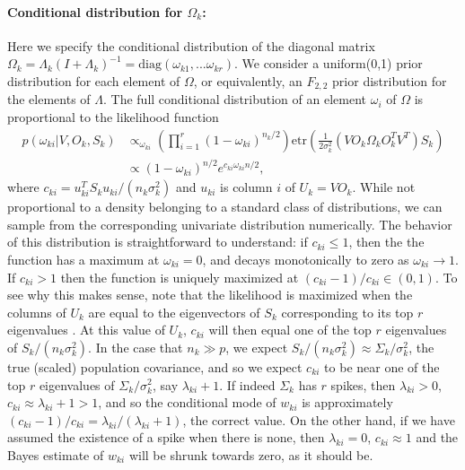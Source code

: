 \documentclass{statsoc}
\newcommand{\etr}{\text{etr}}
\begin{document}
\paragraph{Conditional distribution for $\Omega_k$:} Here we specify the
conditional distribution of the diagonal matrix
$\Omega_k = \Lambda_k(I+\Lambda_k)^{-1} = \text{diag}(\omega_{k1},
... \omega_{kr})$.
We consider a uniform(0,1) prior distribution for each element of
$\Omega$, or equivalently, an $F_{2,2}$ prior distribution for the
elements of $\Lambda$.  The full conditional distribution of an
element $\omega_i$ of $\Omega$ is proportional to the likelihood
function
\begin{align}
p(\omega_{ki}|V, O_k, S_k) &\propto_{\omega_{ki}}
  \left(\prod_{i=1}^r(1-\omega_{ki})^{n_k/2}  \right)
  \etr(\frac{1}{2\sigma_k^2}(VO_k\Omega_kO_k^TV^T)S_k) \\
&  \propto  (1-\omega_{ki})^{n/2} e^{c_{ki} \omega_{ki}  n/2},    
\label{eqn:wpost}
\end{align}
%
\noindent where $c_{ki} = u_{ki}^T S_k u_{ki}/(n_k \sigma^2_k)$ and $ u_{ki}$ is
column $i$ of $U_k = VO_k$.  While not proportional to a density
belonging to a standard class of distributions, we can sample from the
corresponding univariate distribution numerically.  The behavior of
this distribution is straightforward to understand: if $c_{ki}\leq 1$, then
the the function has a maximum at $\omega_{ki} =0$, and decays
monotonically to zero as $\omega_{ki} \rightarrow 1$.  If $c_{ki}>1$ then the
function is uniquely maximized at $(c_{ki}-1)/c_{ki} \in (0,1)$.  To see why
this makes sense, note that the likelihood is maximized when the
columns of $ U_k$ are equal to the eigenvectors of $S_k$
corresponding to its top $r$ eigenvalues
\citep{Tipping1999}. At this value of $U_k$, $c_{ki}$ will then
equal one of the top $r$ eigenvalues of $ S_k/(n_k\sigma_k^2)$.  In the
case that $n_k\gg p$, we expect
$ S_k/(n_k\sigma_k^2)\approx \Sigma_k/\sigma_k^2$, the true (scaled)
population covariance, and so we expect $c_{ki}$ to be near one of the top
$r$ eigenvalues of $\Sigma_k/\sigma^2_k$, say $\lambda_{ki}+1$.  If indeed
$\Sigma_k$ has $r$ spikes, then $\lambda_{ki}>0$,
$c_{ki} \approx \lambda_{ki} +1 > 1$, and so the conditional mode of $w_{ki}$ is
approximately $(c_{ki}-1)/c_{ki} = \lambda_{ki}/(\lambda_{ki}+1)$, the correct value.
On the other hand, if we have assumed the existence of a spike when
there is none, then $\lambda_{ki}=0$, $c_{ki}\approx 1$ and the Bayes estimate
of $w_{ki}$ will be shrunk towards zero, as it should be.
\end{document}
